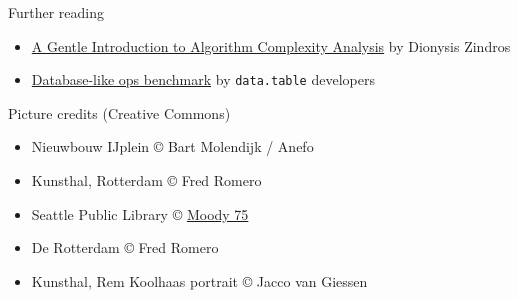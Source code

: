 \documentclass[aspectratio=169,12pt,usepdftitle=false]{beamer} %
\begin{document}
\begin{frame}{Further reading}
    \begin{itemize}
	\item \href{https://discrete.gr/complexity/}{A Gentle Introduction to Algorithm Complexity Analysis} by Dionysis Zindros
	\item \href{https://h2oai.github.io/db-benchmark/}{Database-like ops benchmark} by \texttt{data.table} developers
    \end{itemize}
\end{frame}

{
\begin{frame}[plain]
\end{frame}
}

\begin{frame}{Picture credits (Creative Commons)}
    \begin{itemize}
	\item Nieuwbouw IJplein \copyright{} Bart Molendijk / Anefo
	\item Kunsthal, Rotterdam \copyright{} Fred Romero
	\item Seattle Public Library \copyright{} \href{https://www.flickr.com/people/moody75/}{Moody 75}
	\item De Rotterdam \copyright{} Fred Romero
	\item Kunsthal, Rem Koolhaas portrait \copyright{} Jacco van Giessen
    \end{itemize}
\end{frame}
\end{document}
